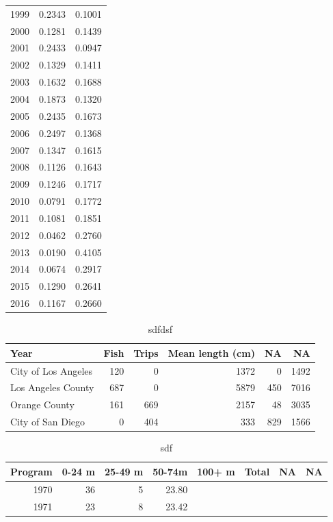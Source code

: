 \documentclass[12pt,]{article}
\begin{document}
\begin{table}[ht]
{\begin{tabular}{rrr}
   1999 & 0.2343 & 0.1001 \\ 
   2000 & 0.1281 & 0.1439 \\ 
   2001 & 0.2433 & 0.0947 \\ 
   2002 & 0.1329 & 0.1411 \\ 
   2003 & 0.1632 & 0.1688 \\ 
   2004 & 0.1873 & 0.1320 \\ 
   2005 & 0.2435 & 0.1673 \\ 
   2006 & 0.2497 & 0.1368 \\ 
   2007 & 0.1347 & 0.1615 \\ 
   2008 & 0.1126 & 0.1643 \\ 
   2009 & 0.1246 & 0.1717 \\ 
   2010 & 0.0791 & 0.1772 \\ 
   2011 & 0.1081 & 0.1851 \\ 
   2012 & 0.0462 & 0.2760 \\ 
   2013 & 0.0190 & 0.4105 \\ 
   2014 & 0.0674 & 0.2917 \\ 
   2015 & 0.1290 & 0.2641 \\ 
   2016 & 0.1167 & 0.2660 \\ 
   \hline
\end{tabular}
}
\end{table}\begin{table}[ht]
\centering
\caption{sdfdsf} 
\label{tab:Fleet7_lengthdepth}
\begin{tabular}{lrrrrr}
  \hline
Year & Fish & Trips & Mean length (cm) & NA & NA \\ 
  \hline
City of Los Angeles & 120 &   0 & 1372 &   0 & 1492 \\ 
  Los Angeles County & 687 &   0 & 5879 & 450 & 7016 \\ 
  Orange County & 161 & 669 & 2157 &  48 & 3035 \\ 
  City of San Diego &   0 & 404 & 333 & 829 & 1566 \\ 
   \hline
\end{tabular}
\end{table}\begin{table}[ht]
\centering
\caption{sdf} 
\label{tab:Fleet7_lengthsample}
\begin{tabular}{rrrrllll}
  \hline
Program & 0-24 m & 25-49 m & 50-74m & 100+ m & Total & NA & NA \\ 
  \hline
1970 &  36 &   5 & 23.80 &  &  &  &  \\ 
  1971 &  23 &   8 & 23.42 &  &  &  &  \\ 

\end{tabular}
\end{table}
\end{document}
